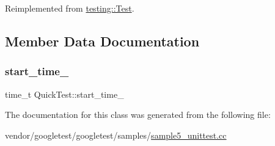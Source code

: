 Reimplemented from \hyperlink{classtesting_1_1_test_a5f0ab439802cbe0ef7552f1a9f791923}{testing\+::\+Test}.



\subsection{Member Data Documentation}
\mbox{\label{class_quick_test_aba6a28bbd733e72e3b088a0b66386809}} 
\subsubsection{\texorpdfstring{start\+\_\+time\+\_\+}{start\_time\_}}
{\footnotesize\ttfamily time\+\_\+t Quick\+Test\+::start\+\_\+time\+\_\+\hspace{0.3cm}{\ttfamily [protected]}}



The documentation for this class was generated from the following file\+:\begin{DoxyCompactItemize}
\item 
vendor/googletest/googletest/samples/\hyperlink{sample5__unittest_8cc}{sample5\+\_\+unittest.\+cc}\end{DoxyCompactItemize}
